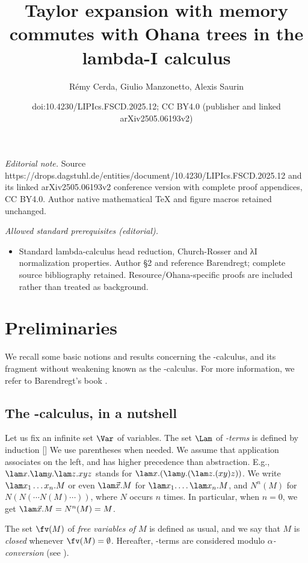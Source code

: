 \documentclass[10pt,a4paper]{amsart}
\title{Taylor expansion with memory commutes with Ohana trees in the lambda-I calculus}
\author{Rémy Cerda, Giulio Manzonetto, Alexis Saurin}
\date{doi:10.4230/LIPIcs.FSCD.2025.12; CC BY4.0 (publisher and linked arXiv2505.06193v2)}
\theoremstyle{definition}
\begin{document}
\maketitle
\noindent\textit{Editorial note.} Source https://drops.dagstuhl.de/entities/document/10.4230/LIPIcs.FSCD.2025.12 and its linked arXiv2505.06193v2 conference version with complete proof appendices, CC BY4.0. Author native mathematical TeX and figure macros retained unchanged.\par\medskip
\noindent\textit{Allowed standard prerequisites (editorial).}\begin{itemize}
\item Standard lambda-calculus head reduction, Church-Rosser and λI normalization properties. Author §2 and reference Barendregt; complete source bibliography retained. Resource/Ohana-specific proofs are included rather than treated as background.
\end{itemize}\medskip

\section{Preliminaries}

We recall some basic notions and results concerning the \lam-calculus, and its fragment without weakening known as the \lamI-calculus. For more information, we refer to Barendregt's book \cite{Bare}.

\subsection{The \lam-calculus, in a nutshell} 
Let us fix an infinite set $\Var$ of variables. The set $\Lam$ of 
\emph{\lam-terms} is defined by induction
[]
We use parentheses when needed.
We assume that application associates on the left, 
and has higher precedence than abstraction.
E.g., $\lam x.\lam y.\lam z.xyz$ stands for $\lam x.(\lam y.(\lam z.(xy)z))$.
We write $\lam x_1 \ldots x_n.M$ or even $\lam\vec x.M$ 
for $\lam x_1.\ldots \lam x_n.M$, 
and $N^n(M)$ for $N(N(\cdots N(M)\cdots))$, where $N$ occurs $n$ times. 
In particular, when $n = 0$, we get $\lam\vec x.M = N^n(M) = M$.

The set $\fv(M)$ of \emph{free variables of $M$} is defined as usual, and we say that $M$ is \emph{closed} whenever $\fv(M) = \emptyset$.
Hereafter, \lam-terms are considered modulo \emph{$\alpha$-conversion}
(see \cite[\S 2.1]{Bare}).
\end{document}
